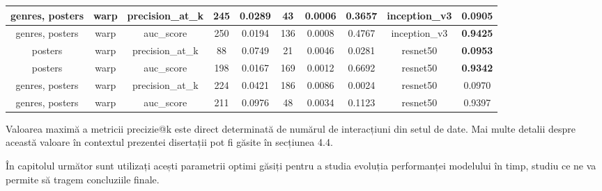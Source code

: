 \begin{table}
{\begin{tabular}{|c|c|c|c|c|c|c|c|c|c|}
\hline
genres, posters                    & warp                            & precision\_at\_k                    & 245             & 0.0289   & 43                     & 0.0006 & 0.3657   & inception\_v3                    & 0.0905                              \\ 
\hline
genres, posters                    & warp                            & auc\_score                          & 250             & 0.0194   & 136                    & 0.0008 & 0.4767    & inception\_v3                    & \textbf{0.9425}                              \\ 
\hline
posters                            & warp                            & precision\_at\_k                    & 88              & 0.0749    & 21                     & 0.0046  & 0.0281  & resnet50                         & \textbf{0.0953}                              \\ 
\hline
posters                            & warp                            & auc\_score                          & 198             & 0.0167   & 169                    & 0.0012 & 0.6692    & resnet50                         & \textbf{0.9342}                              \\ 
\hline
genres, posters                    & warp                            & precision\_at\_k                    & 224             & 0.0421    & 186                    & 0.0086  & 0.0024 & resnet50                         & 0.0970                              \\ 
\hline
genres, posters                    & warp                            & auc\_score                          & 211             & 0.0976    & 48                     & 0.0034  & 0.1123   & resnet50                         & 0.9397                              \\
\hline
\end{tabular}}
\end{table}

Valoarea maximă a metricii precizie@k este direct determinată de numărul de interacțiuni din setul de date. Mai multe detalii despre această valoare în contextul prezentei disertații pot fi găsite în secțiunea 4.4.

În capitolul următor sunt utilizați acești parametrii optimi găsiți pentru a studia evoluția performanței modelului în timp, studiu ce ne va permite să tragem concluziile finale.